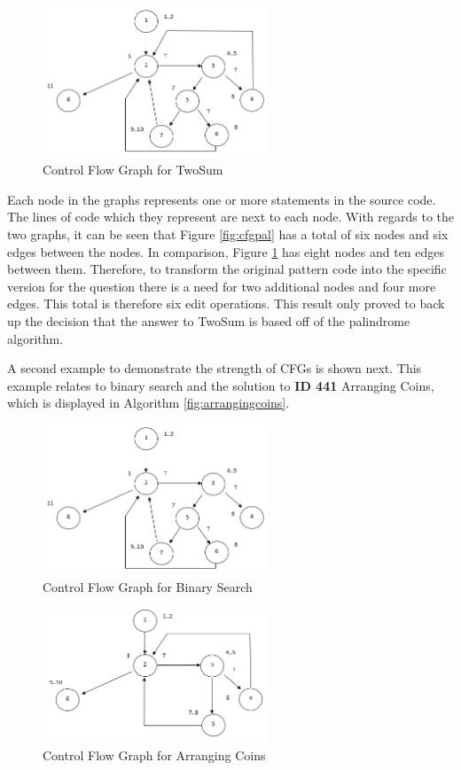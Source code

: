 \documentclass[10pt,twocolumn]{IEEEtran}
\begin{document}
 \begin{figure}[h]
\includegraphics[width=0.6\textwidth]{CFGTwoSum.png}
\caption{Control Flow Graph for TwoSum}
\label{fig:cfgtwosum}
\end{figure}
\par Each node in the graphs represents one or more statements in the source code. The lines of code which they represent are next to each node. With regards to the two graphs, it can be seen that Figure \ref{fig:cfgpal} has a total of six nodes and six edges between the nodes. In comparison, Figure \ref{fig:cfgtwosum} has eight nodes and ten edges between them. Therefore, to transform the original pattern code into the specific version for the question there is a need for two additional nodes and four more edges. This total is therefore six edit operations. This result only proved to back up the decision that the answer to TwoSum is based off of the palindrome algorithm.
\par A second example to demonstrate the strength of CFGs is shown next. This example relates to binary search and the solution to \textbf{ID 441} Arranging Coins, which is displayed in Algorithm \ref{fig:arrangingcoins}. 
 \begin{figure}[h]
\includegraphics[width=0.6\textwidth]{CFGBinarySearch.png}
\caption{Control Flow Graph for Binary Search}
\label{fig:cfgbinarysearch}
\end{figure}
 \begin{figure}[h]
\includegraphics[width=0.6\textwidth]{CFGArrangingCoins.png}
\caption{Control Flow Graph for Arranging Coins}
\label{fig:cfgbinarysearch}
\end{figure}
\end{document}
